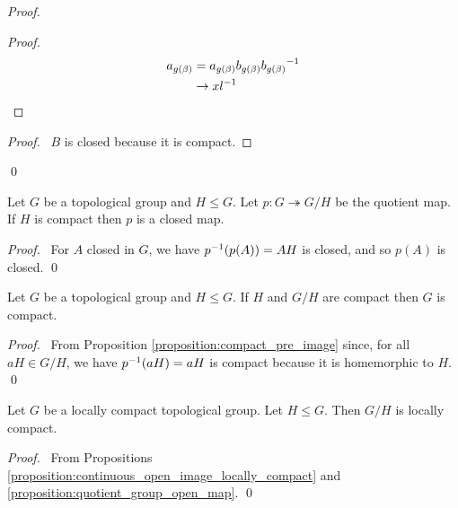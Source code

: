 \begin{proof}
    \pf
    \begin{proof}
        \pf
        \begin{align*}
            a_{g(\beta)} & = a_{g(\beta)} b_{g(\beta)} {b_{g(\beta)}}^{-1} \\
            & \rightarrow x {l}^{-1}
        \end{align*}
    \end{proof}
    \begin{proof}
        \pf\ $B$ is closed because it is compact.
    \end{proof}
    \qed
\end{proof}
\begin{corollary}
    Let $G$ be a topological group and $H \leq G$. Let $p : G \twoheadrightarrow G / H$ be the quotient map.
    If $H$ is compact then $p$ is a closed map.
\end{corollary}

\begin{proof}
    \pf\ For $A$ closed in $G$, we have ${p}^{-1}(p(A)) = AH$ is closed, and so
    $p(A)$ is closed. \qed
\end{proof}

\begin{corollary}
    Let $G$ be a topological group and $H \leq G$. If $H$ and $G / H$ are compact then $G$ is compact.
\end{corollary}

\begin{proof}
    \pf\ From Proposition \ref{proposition:compact_pre_image} since, for all $aH \in G / H$,
    we have ${p}^{-1}(aH) = aH$ is compact because it is homemorphic to $H$. \qed
\end{proof}

\begin{proposition}
    Let $G$ be a locally compact topological group. Let $H \leq G$. Then $G/H$ is locally compact.
\end{proposition}

\begin{proof}
    \pf\ From Propositions \ref{proposition:continuous_open_image_locally_compact}
    and \ref{proposition:quotient_group_open_map}. \qed

\end{proof}